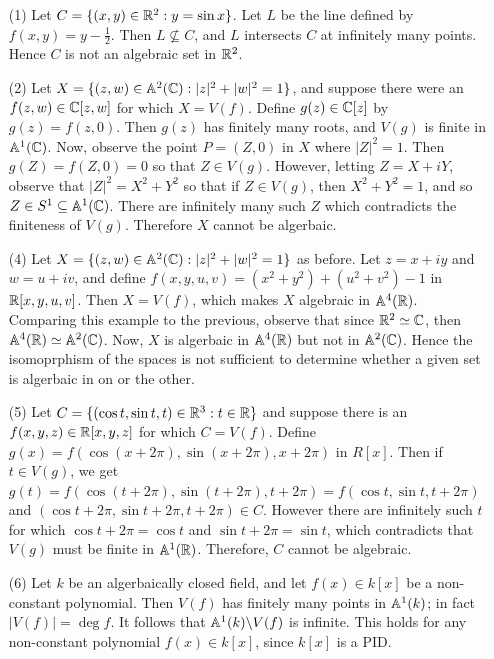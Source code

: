 \begin{example}
  \begin{enumerate}
    \item[(1)] Let $C=\{(x,y) \in \mathbb{R}^2 : y=\sin{x}\}$. Let $L$ be the
      line defined by $f(x,y)=y-\frac{1}{2}$. Then $L \not\subseteq
      C$, and $L$ intersects $C$ at infinitely many points. Hence $C$
      is not an algebraic set in $\mathbb{R}^2$.

    \item[(2)] Let $X=\{(z,w) \in \mathbb{A}^2(\mathbb{C}) : |z|^2+|w|^2=1\}$, and
      suppose there were an $f(z,w) \in \mathbb{C}[z,w]$ for which $X=V(f)$.
      Define $g(z) \in \mathbb{C}[z]$ by $g(z)=f(z,0)$. Then $g(z)$ has
      finitely many roots, and $V(g)$ is finite in $\mathbb{A}^1(\mathbb{C})$. Now,
      observe the point $P=(Z,0)$ in $X$ where $|Z|^2=1$. Then
      $g(Z)=f(Z,0)=0$ so that $Z \in V(g)$. However, letting $Z=X+iY$,
      observe that $|Z|^2=X^2+Y^2$ so that if $Z \in V(g)$, then
      $X^2+Y^2=1$, and so $Z \in S^1 \subseteq \mathbb{A}^1(\mathbb{C})$. There are
      infinitely many such $Z$ which contradicts the finiteness of
      $V(g)$. Therefore $X$ cannot be algerbaic.

    \item[(4)] Let $X=\{(z,w) \in \mathbb{A}^2(\mathbb{C}): |z|^2+|w|^2=1\}$ as
      before. Let $z=x+iy$ and $w=u+iv$, and define
      $f(x,y,u,v)=(x^2+y^2)+(u^2+v^2)-1$ in $\mathbb{R}[x,y,u,v]$. Then
      $X=V(f)$, which makes $X$ algebraic in $\mathbb{A}^4(\mathbb{R})$. Comparing
      this example to the previous, observe that since $\mathbb{R}^2 \simeq
      \mathbb{C}$, then $\mathbb{A}^4(\mathbb{R}) \simeq \mathbb{A}^2(\mathbb{C})$. Now, $X$ is algerbaic in
      $\mathbb{A}^4(\mathbb{R})$ but not in $\mathbb{A}^2(\mathbb{C})$. Hence the isomoprphism of the
      spaces is not sufficient to determine whether a given set is
      algerbaic in on or the other.

    \item[(5)] Let $C=\{(\cos{t}, \sin{t}, t) \in \mathbb{R}^3 : t \in \mathbb{R}\}$
      and suppose there is an $f(x,y,z) \in \mathbb{R}[x,y,z]$ for which
      $C=V(f)$. Define $g(x)=f(\cos{(x+2\pi)}, \sin{(x+2\pi), x+2\pi})$
      in $R[x]$. Then if $t \in V(g)$, we get  $g(t)=
      f(\cos{(t+2\pi)}, \sin{(t+2\pi)}, t+2\pi)=f(\cos{t}, \sin{t},
      t+2\pi)$ and $(\cos{t+2\pi}, \sin{t+2\pi}, t+2\pi) \in C$.
      However there are infinitely such $t$ for which
      $\cos{t+2\pi}=\cos{t}$ and $\sin{t+2\pi}=\sin{t}$, which
      contradicts that $V(g)$ must be finite in $\mathbb{A}^1(\mathbb{R})$. Therefore,
      $C$ cannot be algebraic.

    \item[(6)] Let $k$ be an algerbaically closed field, and let $f(x)
      \in k[x]$ be a non-constant polynomial. Then $V(f)$ has finitely
      many points in $\mathbb{A}^1(k)$; in fact $|V(f)|=\deg{f}$. It follows
      that $\mathbb{A}^1(k) \backslash V(f)$ is infinite. This holds for any
      non-constant polynomial $f(x) \in k[x]$, since $k[x]$ is a PID.


\end{enumerate}
\end{example}
